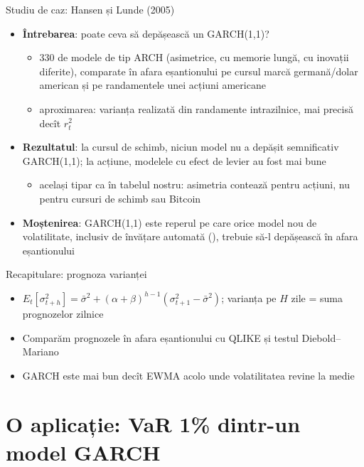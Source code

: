 \begin{frame}{Studiu de caz: Hansen și Lunde (2005)}
\itemsize{\small}
\begin{itemize}
    \item \textbf{Întrebarea}: poate ceva să depășească un GARCH(1,1)? 
    \begin{itemize}
        \item 330 de modele de tip ARCH (asimetrice, cu memorie lungă, cu inovații diferite), comparate în afara eșantionului pe cursul marcă germană/dolar american și pe randamentele unei acțiuni americane
        \item aproximarea: varianța realizată din randamente intrazilnice, mai precisă decît $r_t^2$
    \end{itemize}
    \item \textbf{Rezultatul}: la cursul de schimb, niciun model nu a depășit semnificativ GARCH(1,1); la acțiune, modelele cu efect de levier au fost mai bune
    \begin{itemize}
        \item același tipar ca în tabelul nostru: asimetria contează pentru acțiuni, nu pentru cursuri de schimb sau Bitcoin
    \end{itemize}
    \item \textbf{Moștenirea}: GARCH(1,1) este reperul pe care orice model nou de volatilitate, inclusiv de învățare automată (), trebuie să-l depășească în afara eșantionului
\end{itemize}
\end{frame}

\begin{frame}{Recapitulare: prognoza varianței}
\itemsize{\small}
\begin{itemize}
    \item $E_t[\sigma_{t+h}^2] = \bar\sigma^2 + (\alpha + \beta)^{h-1}(\sigma_{t+1}^2 - \bar\sigma^2)$; varianța pe $H$ zile = suma prognozelor zilnice
    \item Comparăm prognozele în afara eșantionului cu QLIKE și testul Diebold--Mariano
    \item GARCH este mai bun decît EWMA acolo unde volatilitatea revine la medie
\end{itemize}
\end{frame}


\section{O aplicație: VaR 1\% dintr-un model GARCH}

